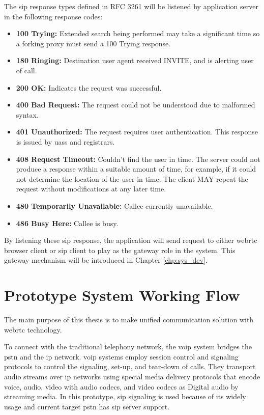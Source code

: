 \noindent The \gls{sip} response types defined in RFC 3261 will be listened by application server in the following response codes\cite{wiki:sip_response_codes}:

\begin{itemize}[topsep=-1em,parsep=0em,itemsep=0em]
 \item \textbf{100 Trying:} Extended search being performed may take a significant time so a forking proxy must send a 100 Trying response.
 \item \textbf{180 Ringing:} Destination user agent received INVITE, and is alerting user of call.
 \item \textbf{200 OK:} Indicates the request was successful.
 \item \textbf{400 Bad Request:} The request could not be understood due to malformed syntax.
 \item \textbf{401 Unauthorized:} The request requires user authentication. This response is issued by \gls{uas}s and registrars.
 \item \textbf{408 Request Timeout:} Couldn't find the user in time. The server could not produce a response within a suitable amount of time, for example, if it could not determine the location of the user in time. The client MAY repeat the request without modifications at any later time.
 \item \textbf{480 Temporarily Unavailable:} Callee currently unavailable.
 \item \textbf{486 Busy Here:} Callee is busy.
\end{itemize}

\par By listening these \gls{sip} response, the application will send request to either \gls{webrtc} browser client or \gls{sip} client to play as the gateway role in the system. This gateway mechanism will be introduced in Chapter \ref{chp:sys_dev}.

\section{Prototype System Working Flow}
\noindent The main purpose of this thesis is to make unified communication solution with \gls{webrtc} technology. 
\par To connect with the traditional telephony network, the \gls{voip} system bridges the \gls{pstn} and the \gls{ip} network. \gls{voip} systems employ session control and signaling protocols to control the signaling, set-up, and tear-down of calls. They transport audio streams over \gls{ip} networks using special media delivery protocols that encode voice, audio, video with audio codecs, and video codecs as Digital audio by streaming media. In this prototype, \gls{sip} signaling is used because of its widely usage and current target \gls{pstn} has \gls{sip} server support.


